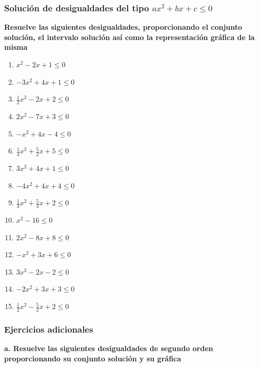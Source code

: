 \documentclass[12pt]{article}
\begin{document}
\subsubsection{\texorpdfstring{Solución de desigualdades del tipo
\(ax^2+bx+c\leq 0\)}{Solución de desigualdades del tipo ax\^{}2+bx+c\textbackslash leq 0}}\label{soluciuxf3n-de-desigualdades-del-tipo-ax2bxcleq-0}

\textbf{Resuelve las siguientes desigualdades, proporcionando el
conjunto solución, el intervalo solución así como la representación
gráfica de la misma}

\begin{enumerate}
\def\labelenumi{\arabic{enumi}.}
\item
  \(x^2-2x+1\leq0\)
\item
  \(-3x^2+4x+1\leq0\)
\item
  \(\frac{1}{2}x^2-2x+2\leq0\)
\item
  \(2x^2-7x+3\leq0\)
\item
  \(-x^2+4x-4\leq0\)
\item
  \(\frac{1}{4}x^2+\frac{5}{2}x+5\leq0\)
\item
  \(3x^2+4x+1\leq0\)
\item
  \(-4x^2+4x+4\leq0\)
\item
  \(\frac{1}{3}x^2+\frac{5}{3}x+2\leq0\)
\item
  \(x^2-16\leq0\)
\item
  \(2x^2-8x+8\leq0\)
\item
  \(-x^2+3x+6\leq0\)
\item
  \(3x^2-2x-2\leq0\)
\item
  \(-2x^2+3x+3\leq0\)
\item
  \(\frac{1}{2}x^2-\frac{5}{2}x+2\leq0\)
\end{enumerate}

\subsubsection{Ejercicios adicionales}\label{ejercicios-adicionales-1}

\textbf{a. Resuelve las siguientes desigualdades de segundo orden
proporcionando su conjunto solución y su gráfica}
\end{document}
